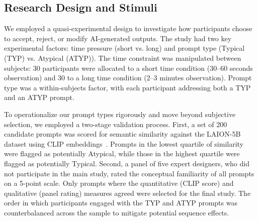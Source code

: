 \documentclass[letterpaper]{article} %
\begin{document}
\subsection{Research Design and Stimuli}

We employed a quasi-experimental design to investigate how participants choose to accept, reject, or modify AI-generated outputs. The study had two key experimental factors: time pressure (short vs. long) and prompt type (Typical (TYP) vs. Atypical (ATYP)). The time constraint was manipulated between subjects: 30 participants were allocated to a short time condition (30–60 seconds observation) and 30 to a long time condition (2–3 minutes observation). Prompt type was a within-subjects factor, with each participant addressing both a TYP and an ATYP prompt.

To operationalize our prompt types rigorously and move beyond subjective selection, we employed a two-stage validation process. First, a set of 200 candidate prompts was scored for semantic similarity against the LAION-5B dataset using CLIP embeddings~\cite{radford2021learning}. Prompts in the lowest quartile of similarity were flagged as potentially Atypical, while those in the highest quartile were flagged as potentially Typical. Second, a panel of five expert designers, who did not participate in the main study, rated the conceptual familiarity of all prompts on a 5-point scale. Only prompts where the quantitative (CLIP score) and qualitative (panel rating) measures agreed were selected for the final study. The order in which participants engaged with the TYP and ATYP prompts was counterbalanced across the sample to mitigate potential sequence effects.
\end{document}
